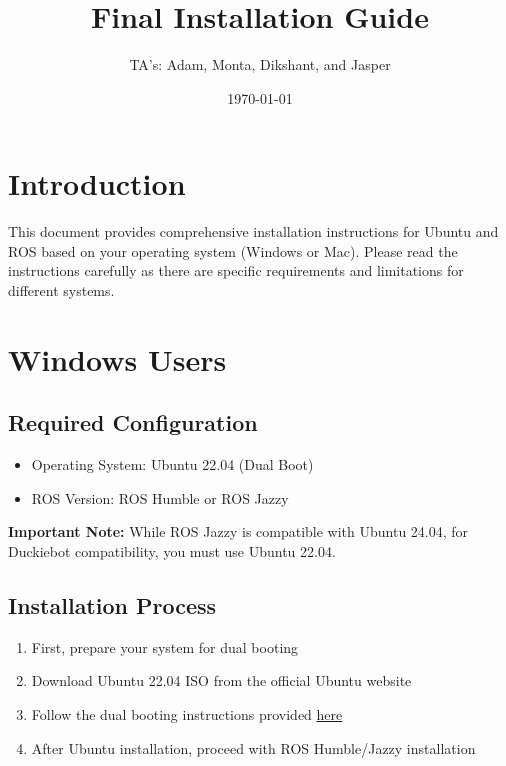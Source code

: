 \documentclass{article}
\title{Final Installation Guide}
\author{TA's: Adam, Monta, Dikshant, and Jasper}
\date{\today}
\begin{document}
\maketitle

\section{Introduction}
This document provides comprehensive installation instructions for Ubuntu and ROS based on your operating system (Windows or Mac). Please read the instructions carefully as there are specific requirements and limitations for different systems.

\section{Windows Users}
\subsection{Required Configuration}
\begin{tcolorbox}[
    title={Final Configuration for Windows Users}, colframe=successgreen,colback=successgreen!10
]
    \begin{itemize}
        \item Operating System: Ubuntu 22.04 (Dual Boot)
        \item ROS Version: ROS Humble or ROS Jazzy
    \end{itemize}
    \textbf{\textcolor{warningred}{Important Note:}} While ROS Jazzy is compatible with Ubuntu 24.04, for Duckiebot compatibility, you must use Ubuntu 22.04.
\end{tcolorbox}

\subsection{Installation Process}
\begin{enumerate}
    \item First, prepare your system for dual booting
    \item Download Ubuntu 22.04 ISO from the official Ubuntu website
    \item Follow the dual booting instructions provided \href{https://github.com/Dikshuy/dual-boot-Mac-Windows/blob/main/ubuntu-installation.pdf}{here}
    \item After Ubuntu installation, proceed with ROS Humble/Jazzy installation
\end{enumerate}
\end{document}
